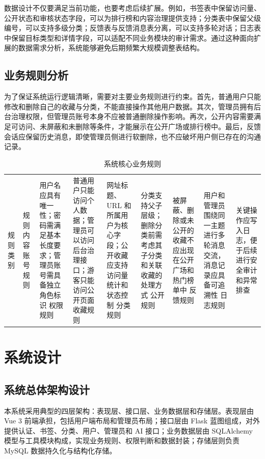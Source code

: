 \documentclass[12pt,a4paper]{ctexart}
\begin{document}
数据设计不仅要满足当前功能，也要考虑后续扩展。例如，书签表中保留访问量、公开状态和审核状态字段，可以为排行榜和内容治理提供支持；分类表中保留父级编号，可以支持多级分类；反馈表与反馈消息表分离，可以支持多轮对话；日志表中保留目标类型和详情字段，可以适配不同业务模块的审计需求。通过这种面向扩展的数据需求分析，系统能够避免后期频繁大规模调整表结构。

\subsection{业务规则分析}
为了保证系统运行逻辑清晰，需要对主要业务规则进行约束。首先，普通用户只能修改和删除自己的收藏与分类，不能直接操作其他用户数据。其次，管理员拥有后台治理权限，但管理员账号本身不应被普通删除操作影响。再次，公开内容需要满足可访问、未屏蔽和未删除等条件，才能展示在公开广场或排行榜中。最后，反馈会话应保留历史消息，即使管理员侧进行软删除，也不应破坏用户侧已存在的沟通记录。

\begin{table}[H]
\centering
\caption{系统核心业务规则}
\begin{tabular}{p{3.2cm}p{9.2cm}}
\toprule
规则类别 & 规则内容 
\midrule
账号规则 & 用户名应具有唯一性；密码需满足基本长度要求；管理员账号需具备独立角色标识 
权限规则 & 普通用户只能访问个人数据；管理员可以访问后台治理接口；游客只能访问公开页面 
收藏规则 & 网址标题、URL 和所属用户为核心字段；公开收藏应支持访问量统计和状态控制 
分类规则 & 分类支持父子层级；删除分类前需考虑其子分类和关联收藏的处理方式 
公开规则 & 被屏蔽、删除或未公开的收藏不应出现在公开广场和热门榜单中 
反馈规则 & 用户和管理员围绕同一主题进行多轮消息交流，消息记录应具备可追溯性 
日志规则 & 关键操作应写入日志，便于后续进行安全审计和异常排查 
\bottomrule
\end{tabular}
\end{table}

\clearpage
\section{系统设计}

\subsection{系统总体架构设计}
本系统采用典型的四层架构：表现层、接口层、业务数据层和存储层。表现层由 Vue 3 前端承担，包括用户端布局和管理员布局；接口层由 Flask 蓝图组成，对外提供认证、书签、分类、用户、管理员和 AI 接口；业务数据层由 SQLAlchemy 模型与工具模块构成，实现业务规则、权限判断和数据封装；存储层则负责 MySQL 数据持久化与结构化存储。
\end{document}
